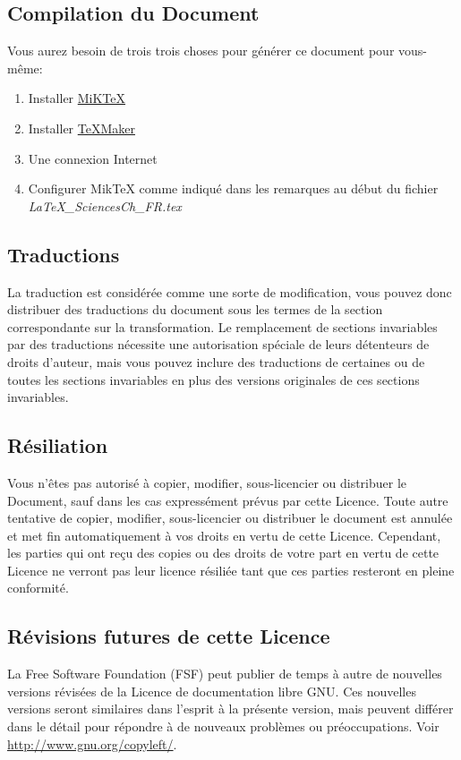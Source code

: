 	\subsection{Compilation du Document}
	Vous aurez besoin de trois trois choses pour g\'en\'erer ce document pour vous-même:
	\begin{enumerate}
		\item Installer \href{https://miktex.org/}{MiKTeX}

		\item Installer \href{http://www.xm1math.net/texmaker/index_fr.html}{TeXMaker}

		\item Une connexion Internet

		\item Configurer MikTeX comme indiqu\'e dans les remarques au d\'ebut du fichier \textit{LaTeX\_SciencesCh\_FR.tex}
	\end{enumerate}

	\subsection{Traductions}
	La traduction est consid\'er\'ee comme une sorte de modification, vous pouvez donc distribuer des traductions du document sous les termes de la section correspondante sur la transformation. Le remplacement de sections invariables par des traductions n\'ecessite une autorisation sp\'eciale de leurs d\'etenteurs de droits d'auteur, mais vous pouvez inclure des traductions de certaines ou de toutes les sections invariables en plus des versions originales de ces sections invariables.

	\subsection{R\'esiliation}
	Vous n'êtes pas autoris\'e à copier, modifier, sous-licencier ou distribuer le Document, sauf dans les cas express\'ement pr\'evus par cette Licence. Toute autre tentative de copier, modifier, sous-licencier ou distribuer le document est annul\'ee et met fin automatiquement à vos droits en vertu de cette Licence. Cependant, les parties qui ont reçu des copies ou des droits de votre part en vertu de cette Licence ne verront pas leur licence r\'esili\'ee tant que ces parties resteront en pleine conformit\'e.

	\subsection{R\'evisions futures de cette Licence}
	La Free Software Foundation (FSF) peut publier de temps à autre de nouvelles versions r\'evis\'ees de la Licence de documentation libre GNU. Ces nouvelles versions seront similaires dans l'esprit à la pr\'esente version, mais peuvent diff\'erer dans le d\'etail pour r\'epondre à de nouveaux problèmes ou pr\'eoccupations. Voir \href{http://www.gnu.org/copyleft/}{{\color{blue} http://www.gnu.org/copyleft/}}.

